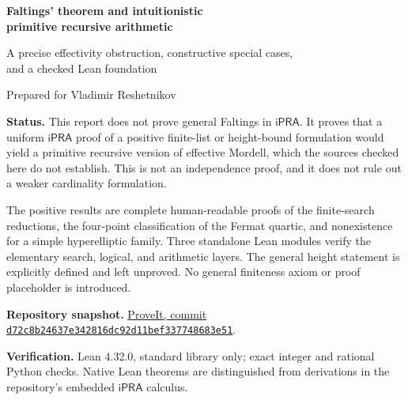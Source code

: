 \documentclass[11pt,letterpaper]{article}
\newcommand{\iPRA}{\mathsf{iPRA}}
\theoremstyle{definition}
\begin{document}
\begin{titlepage}
\centering\vspace*{1.2cm}
{\LARGE\bfseries Faltings' theorem and intuitionistic\\[5pt]
primitive recursive arithmetic\par}
\vspace{0.6cm}
{\large A precise effectivity obstruction, constructive special cases,\\
and a checked Lean foundation\par}
\vspace{0.9cm}
{\large Prepared for Vladimir Reshetnikov\par}
\vspace{0.2cm}{November 15, 2026\par}
\vspace{0.8cm}
\begin{minipage}{0.91\textwidth}
\textbf{Status.} This report does not prove general Faltings in $\iPRA$.
It proves that a uniform $\iPRA$ proof of a positive finite-list or
height-bound formulation would yield a primitive recursive version of
effective Mordell, which the
sources checked here do not establish. This is not an independence proof,
and it does not rule out a weaker cardinality formulation.

The positive results are complete human-readable proofs of the finite-search
reductions, the four-point classification of the Fermat quartic, and
nonexistence for a simple hyperelliptic family. Three standalone Lean modules
verify the elementary search, logical, and arithmetic layers.
The general height statement is explicitly defined and left unproved.
No general finiteness axiom or proof placeholder is introduced.
\end{minipage}
\vfill
\begin{minipage}{0.91\textwidth}\small
\textbf{Repository snapshot.}
\href{https://github.com/VladimirReshetnikov/ProveIt/commit/d72c8b24637e342816dc92d11bef337748683e51}
{ProveIt, commit \texttt{d72c8b24637e342816dc92d11bef337748683e51}}.

\textbf{Verification.} Lean 4.32.0, standard library only; exact integer
and rational Python checks. Native Lean theorems are distinguished from
derivations in the repository's embedded $\iPRA$ calculus.
\end{minipage}
\end{titlepage}
\end{document}
